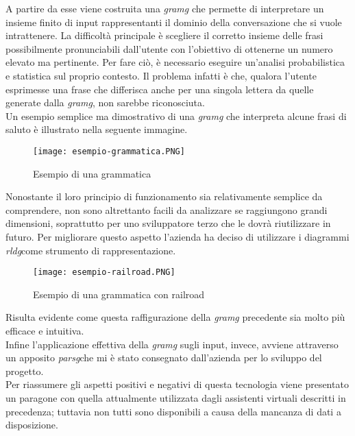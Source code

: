 A partire da esse viene costruita una \emph{\gls{gramg}} che permette di interpretare un insieme finito di input rappresentanti il dominio della conversazione che si vuole intrattenere. La difficoltà principale è scegliere il corretto insieme delle frasi possibilmente pronunciabili dall'utente con l'obiettivo di ottenerne un numero elevato ma pertinente. Per fare ciò, è necessario eseguire un'analisi probabilistica e statistica sul proprio contesto. Il problema infatti è che, qualora l'utente esprimesse una frase che differisca anche per una singola lettera da quelle generate dalla \emph{\gls{gramg}}, non sarebbe riconosciuta. \\
Un esempio semplice ma dimostrativo di una \emph{\gls{gramg}} che interpreta alcune frasi di saluto è illustrato nella seguente immagine.

\begin{figure}[htbp]
	\begin{center}
		\texttt{[image: esempio-grammatica.PNG]}
		\caption{Esempio di una grammatica}
	\end{center}
\end{figure}

\vspace{2cm}

Nonostante il loro principio di funzionamento sia relativamente semplice da comprendere, non sono altrettanto facili da analizzare se raggiungono grandi dimensioni, soprattutto per uno sviluppatore terzo che le dovrà riutilizzare in futuro. Per migliorare questo aspetto l'azienda ha deciso di utilizzare i diagrammi \emph{\gls{rldg}}\glsfirstoccur come strumento di rappresentazione. \\

\begin{figure}[htbp]
	\begin{center}
		\texttt{[image: esempio-railroad.PNG]}
		\caption{Esempio di una grammatica con railroad}
	\end{center}
\end{figure}

Risulta evidente come questa raffigurazione della \emph{\gls{gramg}} precedente sia molto più efficace e intuitiva. \\
Infine l'applicazione effettiva della \emph{\gls{gramg}} sugli input, invece, avviene attraverso un apposito \emph{\gls{parsg}}\glsfirstoccur che mi è stato consegnato dall'azienda per lo sviluppo del progetto. \\
Per riassumere gli aspetti positivi e negativi di questa tecnologia viene presentato un paragone con quella attualmente utilizzata dagli assistenti virtuali descritti in precedenza; tuttavia non tutti sono disponibili a causa della mancanza di dati a disposizione.

